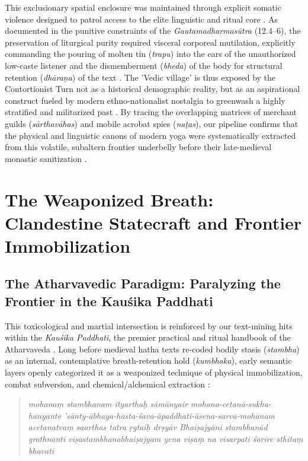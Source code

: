 \documentclass[11pt,twoside,letterpaper]{article}
\begin{document}
This exclusionary spatial enclosure was maintained through explicit somatic violence designed to patrol access to the elite linguistic and ritual core \citep{McCartney2026}. As documented in the punitive constraints of the \textit{Gautamadharmasūtra} (12.4–6), the preservation of liturgical purity required visceral corporeal mutilation, explicitly commanding the pouring of molten tin (\textit{trapu}) into the ears of the unauthorized low-caste listener and the dismemberment (\textit{bheda}) of the body for structural retention (\textit{dhāraṇa}) of the text \citep{McCartney2026}. The 'Vedic village' is thus exposed by the Contortionist Turn not as a historical demographic reality, but as an aspirational construct fueled by modern ethno-nationalist nostalgia to greenwash a highly stratified and militarized past \citep{McCartney2026}. By tracing the overlapping matrices of merchant guilds (\textit{sārthavāhas}) and mobile acrobat spies (\textit{naṭas}), our pipeline confirms that the physical and linguistic canons of modern yoga were systematically extracted from this volatile, subaltern frontier underbelly before their late-medieval monastic sanitization \citep{McCartney2026}.

\section{The Weaponized Breath: Clandestine Statecraft and Frontier Immobilization}

\subsection{The Atharvavedic Paradigm: Paralyzing the Frontier in the Kauśika Paddhati}
This toxicological and martial intersection is reinforced by our text-mining hits within the \textit{Kauśika Paddhati}, the premier practical and ritual handbook of the Atharvaveda \citep{KausP}. Long before medieval hatha texts re-coded bodily stasis (\textit{stambha}) as an internal, contemplative breath-retention hold (\textit{kumbhaka}), early semantic layers openly categorized it as a weaponized technique of physical immobilization, combat subversion, and chemical/alchemical extraction \citep{Birch2024, KausP}:

\begin{quote}
\small
\textit{mohanaṃ stambhanam ityarthaḥ sāmānyair mohana-cetanā-sukha-hanyante 'sānty-ābhaya-hasta-śava-āpaddhati-āsena-sarva-mohanam acetanatvaṃ sa arthas tatra ṛgtaiḥ d{r}ṣyāv Bhaiṣajyāni stambhanād grathnanti viṣastambhanabhaiṣajyam yena viṣaṃ na visarpati śarīre sthitaṃ bhavati }
\end{quote}
\end{document}

